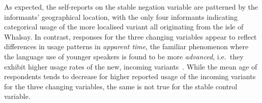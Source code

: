 As expected, the self-reports on the stable negation variable are patterned by the informants' geographical location, with the only four informants indicating categorical usage of the more localised variant all originating from the isle of Whalsay. In contrast, responses for the three changing variables appear to reflect differences in usage patterns in \emph{apparent time}, the familiar phenomenon where the language use of younger speakers is found to be more \emph{advanced}, i.e.~they exhibit higher usage rates of the new, incoming variants~\citep{Wagner2012theory}.
While the mean age of respondents tends to decrease for higher reported usage of the incoming variants for the three changing variables, the same is not true for the stable control variable.



